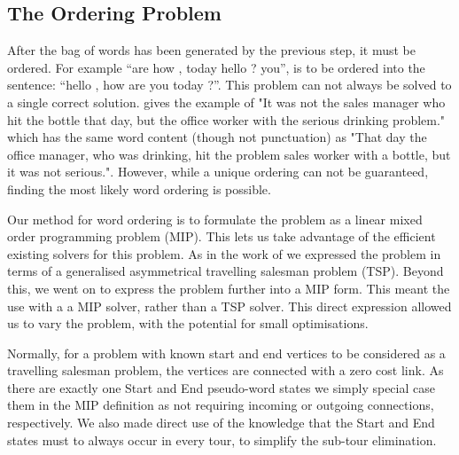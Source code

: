 \documentclass[11pt]{article}
\theoremstyle{plain}
\theoremstyle{definition}
\begin{document}
\subsection{The Ordering Problem} \label{ordering}


After the bag of words has been generated by the previous step, it must be ordered. For example “are how , today hello ? you”, is to be ordered into the sentence: “hello , how are you today ?”. This problem can not always be solved to a single correct solution. \textcite{Mitchell2008}  gives the example of "It was not the sales manager who hit the bottle that day, but the office worker with the serious drinking problem." which has the same word content (though not punctuation) as "That day the office manager, who was drinking, hit the problem sales worker with a bottle, but it was not serious.". However, while a unique ordering can not be guaranteed, finding the most likely word ordering is possible.

Our method for word ordering is to formulate the problem as a linear mixed order programming problem (MIP). This lets us take advantage of the efficient existing solvers for this problem. As in the work of \textcite{Horvat2014} we expressed the problem in terms of a generalised asymmetrical travelling salesman problem (TSP). Beyond this, we went on to express the problem further into a MIP form. This meant the use with a a MIP solver, rather than a TSP solver. This direct expression allowed us to vary the problem, with the potential for small optimisations.

Normally, for a problem with known start and end vertices to be considered as a travelling salesman problem, the vertices are connected with a zero cost link. As there are exactly one Start and End pseudo-word states we simply special case them in the MIP definition as not requiring incoming or outgoing connections, respectively. We also made direct use of the knowledge that the Start and End states must to always occur in every tour, to simplify the sub-tour elimination. 
\end{document}
